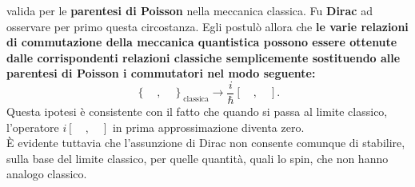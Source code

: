 valida per le \textbf{parentesi di Poisson} nella meccanica classica. Fu \textbf{Dirac} ad osservare per primo questa circostanza. Egli postulò allora che \textbf{le varie relazioni di commutazione della meccanica quantistica possono essere ottenute dalle corrispondenti relazioni classiche semplicemente sostituendo alle parentesi di Poisson i commutatori nel modo seguente:}
\begin{equation}
\left\{ \quad, \quad \right\} _{\textrm{classica}} \rightarrow \frac{i}{\hbar}\left[ \quad, \quad \right] .
\end{equation}
Questa ipotesi è consistente con il fatto che quando si passa al limite classico, l'operatore $i\left[ \quad, \quad \right]$ in prima approssimazione diventa zero.\\
È evidente tuttavia che l'assunzione di Dirac non consente comunque di stabilire, sulla base del limite classico, per quelle quantità, quali lo spin, che non hanno analogo classico.
